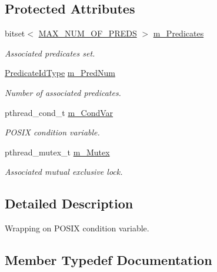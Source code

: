 \subsection*{Protected Attributes}
\begin{DoxyCompactItemize}
\item 
bitset$<$ \hyperlink{CondVarClass_8h_a6e8562f77c7eeea17bbd7dad99cc5a5d}{M\+A\+X\+\_\+\+N\+U\+M\+\_\+\+O\+F\+\_\+\+P\+R\+E\+DS} $>$ \hyperlink{classCondVarClass_aaf966656af82194b11b9277dfd331d7f}{m\+\_\+\+Predicates}
\begin{DoxyCompactList}\small\item\em Associated predicates set. \end{DoxyCompactList}\item 
\hyperlink{classCondVarClass_a8e27f99972b8b95f064d6657a4583a5b}{Predicate\+Id\+Type} \hyperlink{classCondVarClass_a3e3eff2444917f162ede65d687ebeb06}{m\+\_\+\+Pred\+Num}
\begin{DoxyCompactList}\small\item\em Number of associated predicates. \end{DoxyCompactList}\item 
pthread\+\_\+cond\+\_\+t \hyperlink{classCondVarClass_ae74b5148e366723b2124aed2c3181d83}{m\+\_\+\+Cond\+Var}
\begin{DoxyCompactList}\small\item\em P\+O\+S\+IX condition variable. \end{DoxyCompactList}\item 
pthread\+\_\+mutex\+\_\+t \hyperlink{classCondVarClass_a175e2f43db6ca2fe35d4d1a35b8b2453}{m\+\_\+\+Mutex}
\begin{DoxyCompactList}\small\item\em Associated mutual exclusive lock. \end{DoxyCompactList}\end{DoxyCompactItemize}


\subsection{Detailed Description}
Wrapping on P\+O\+S\+IX condition variable. 

\subsection{Member Typedef Documentation}
\mbox{\label{classCondVarClass_a8e27f99972b8b95f064d6657a4583a5b}} 
